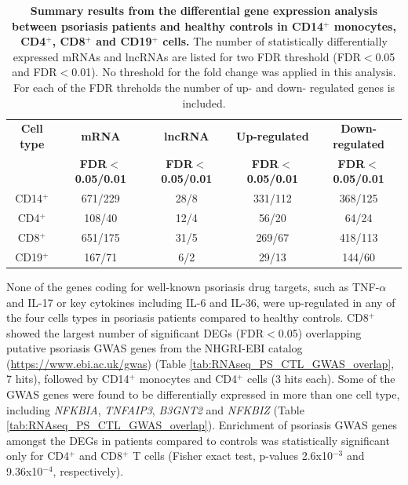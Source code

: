 \begin{table}[htbp]
\centering
\begin{tabular}{@{} c c c c c}
\toprule
\textbf{Cell type}   & \textbf{mRNA}            & \textbf{lncRNA}           & \textbf{Up-regulated}        & \textbf{Down-regulated}\\
                     & \textbf{FDR$<$0.05/0.01} & \textbf{FDR$<$0.05/0.01}  & \textbf{FDR$<$0.05/0.01}    & \textbf{FDR$<$0.05/0.01}\\
	
										
\midrule
\midrule
CD14$^+$             & 671/229                  & 28/8                    & 331/112                       &368/125\\               
CD4$^+$              & 108/40                   & 12/4                    & 56/20                         &64/24 \\
CD8$^+$              & 651/175                  & 31/5                    & 269/67                        &418/113 \\
CD19$^+$             & 167/71                   & 6/2                     & 29/13                         &144/60\\
\bottomrule 
\end{tabular}
\medskip %
\caption[Summary results from the differential gene expression analysis between psoriasis patients and healthy controls in CD14$^+$ monocytes, CD4$^+$, CD8$^+$ and CD19$^+$ cells.]{\textbf{Summary results from the differential gene expression analysis between psoriasis patients and healthy controls in CD14$^+$ monocytes, CD4$^+$, CD8$^+$ and CD19$^+$ cells.} The number of statistically differentially expressed mRNAs and lncRNAs are listed for two FDR threshold (FDR$<$0.05 and FDR$<$0.01). No threshold for the fold change was applied in this analysis. For each of the FDR threholds the number of up- and down- regulated genes is included.}
\label{tab:RNAseq_PS_CTL_differential_analysis_results}
\end{table}
\bigskip %


None of the genes coding for well-known psoriasis drug targets, such as TNF-$\alpha$ and IL-17 or key cytokines including IL-6 and IL-36, were up-regulated in any of the four cells types in psoriasis patients compared to healthy controls. CD8$^+$ showed the largest number of significant DEGs (FDR$<$0.05) overlapping putative psoriasis GWAS genes from the NHGRI-EBI catalog (\url{https://www.ebi.ac.uk/gwas}) (Table \ref{tab:RNAseq_PS_CTL_GWAS_overlap}, 7 hits), followed by CD14$^+$ monocytes and CD4$^+$ cells (3 hits each). Some of the GWAS genes were found to be differentially expressed in more than one cell type, including \textit{NFKBIA}, \textit{TNFAIP3}, \textit{B3GNT2} and \textit{NFKBIZ} (Table \ref{tab:RNAseq_PS_CTL_GWAS_overlap}). Enrichment of psoriasis GWAS genes amongst the DEGs in patients compared to controls was statistically significant only for CD4$^+$ and CD8$^+$ T cells (Fisher exact test, p-values 2.6x10$^{-3}$ and 9.36x10$^{-4}$, respectively).

